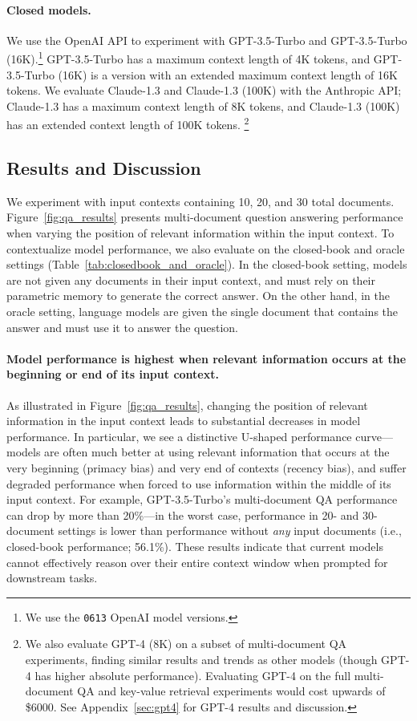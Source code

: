 \paragraph{Closed models.} We use the OpenAI API to experiment with GPT-3.5-Turbo and GPT-3.5-Turbo (16K).\footnote{We use the \texttt{0613} OpenAI model versions.} GPT-3.5-Turbo has a maximum context length of 4K tokens, and GPT-3.5-Turbo (16K) is a version with an extended maximum context length of 16K tokens. We evaluate Claude-1.3 and Claude-1.3 (100K) with the Anthropic API; Claude-1.3 has a maximum context length of 8K tokens, and Claude-1.3 (100K) has an extended context length of 100K tokens.
\footnote{We also evaluate GPT-4 (8K) on a subset of multi-document QA experiments, finding similar results and trends as other models (though GPT-4 has higher absolute performance). Evaluating GPT-4 on the full multi-document QA and key-value retrieval experiments would cost upwards of \$6000. See Appendix~\ref{sec:gpt4} for GPT-4 results and discussion.}

\subsection{Results and Discussion}\label{sec:qa_results}
We experiment with input contexts containing 10, 20, and 30 total documents.
Figure~\ref{fig:qa_results} presents multi-document question answering performance when varying the position of relevant information within the input context. To contextualize model performance, we also evaluate on the closed-book and oracle settings (Table~\ref{tab:closedbook_and_oracle}).
In the closed-book setting, models are not given any documents in their input context, and must rely on their parametric memory to generate the correct answer. On the other hand, in the oracle setting, language models are given the single document that contains the answer and must use it to answer the question.

\paragraph{Model performance is highest when relevant information occurs at the beginning or end of its input context.} As illustrated in Figure~\ref{fig:qa_results}, changing the position of relevant information in the input context leads to substantial decreases in model performance. In particular, we see a distinctive U-shaped performance curve---models are often much better at using relevant information that occurs at the very beginning (primacy bias) and very end of contexts (recency bias), and suffer degraded performance when forced to use information within the middle of its input context. For example, GPT-3.5-Turbo's multi-document QA performance can drop by more than 20\%---in the worst case, performance in 20- and 30-document settings is lower than performance without \emph{any} input documents (i.e., closed-book performance; 56.1\%).
These results indicate that current models cannot effectively reason over their entire context window when prompted for downstream tasks.


